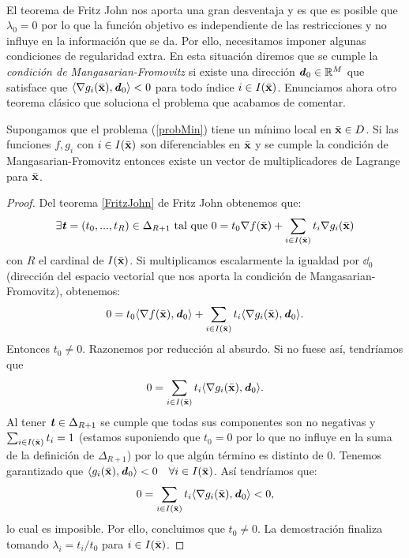		\paragraph{}El teorema de Fritz John nos aporta una gran desventaja y es que es posible que $ \lambda_0 = 0 $ por lo que la función objetivo es independiente de las restricciones y no influye en la información que se da. Por ello, necesitamos imponer algunas condiciones de regularidad extra. En esta situación diremos que se cumple la \textit{condición de Mangasarian-Fromovitz} si existe una dirección $ \textbf{\emph{d}}_0 \in \mathbb{R}^M $ que satisface que $ \langle \nabla g_i(\bar{\mathbf{x}}),\textbf{\emph{d}}_0 \rangle < 0 $ para todo índice $ i \in I(\bar{\mathbf{x}})$. Enunciamos ahora otro teorema clásico que soluciona el problema que acabamos de comentar.
		
		\bigskip
		\begin{teoremaBox}
		Supongamos que el problema (\ref{probMin}) tiene un mínimo local en $ \bar{\mathbf{x}} \in D $. Si las funciones $ f, g_i $ con $ i \in I(\bar{\mathbf{x}}) $ son diferenciables en $ \bar{\mathbf{x}} $ y se cumple la condición de Mangasarian-Fromovitz entonces existe un vector de multiplicadores de Lagrange para $ \bar{\mathbf{x}} $.
		\end{teoremaBox} 
	
		\begin{proof}
		Del teorema \ref{FritzJohn} de Fritz John obtenemos que:
		\[
		\exists \textbf{\emph{t}} = (t_0, ..., t_{R})\in \Delta_{R+1}  \text{ tal que }0 = t_0 \nabla f(\bar{\mathbf{x}}) + \sum_{i \in I(\bar{\mathbf{x}})}  t_i \nabla g_i (\bar{\mathbf{x}})
		\]		
		con $ R $ el cardinal de $ I(\bar{\mathbf{x}}) $. Si multiplicamos escalarmente la igualdad por $ \dd_0 $ (dirección del espacio vectorial que nos aporta la condición de  Mangasarian-Fromovitz), obtenemos:
		\[
		0 = t_0 \langle \nabla f(\bar{\mathbf{x}}), \textbf{\emph{d}}_0 \rangle + \sum_{i \in I(\bar{\mathbf{x}})}  t_i \langle \nabla g_i (\bar{\mathbf{x}}), \textbf{\emph{d}}_0 \rangle.
		\]
		Entonces $ t_0 \neq 0$. Razonemos por reducción al absurdo. Si no fuese así, tendríamos que
		\[
		0 = \sum_{i \in I(\bar{\mathbf{x}})}  t_i \langle \nabla g_i (\bar{\mathbf{x}}), \textbf{\emph{d}}_0 \rangle.
		\]
		Al tener $ \textbf{\emph{t}} \in \Delta_{R+1} $ se cumple que todas sus componentes son no negativas y $ \sum_{i \in I(\bar{\mathbf{x}})}  t_i = 1 $ (estamos suponiendo que $ t_0 = 0 $ por lo que no influye en la suma de la definición de $ \Delta_{R+1} $) por lo que algún término es distinto de 0. Tenemos garantizado que $  \langle g_i (\bar{\mathbf{x}}), \textbf{\emph{d}}_0 \rangle < 0 \quad \forall i \in I(\bar{\mathbf{x}}) $. Así tendríamos que:
			\[
		0 = \sum_{i \in I(\bar{\mathbf{x}})}  t_i \langle \nabla g_i (\bar{\mathbf{x}}), \textbf{\emph{d}}_0 \rangle < 0,
		\]
		lo cual es imposible. Por ello, concluimos que $ t_0 \neq 0 $. La demostración finaliza tomando $ \lambda_i = t_i / t_0 $ para $ i \in I(\bar{\mathbf{x}}) $.
		\end{proof}
		\bigskip
		
